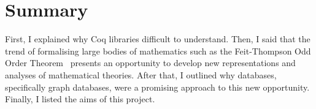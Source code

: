 \newpage

\section{Summary}

First, I explained why Coq libraries difficult to understand. Then, I said
that the trend of formalising large bodies of mathematics such as the
Feit-Thompson Odd Order Theorem~\cite{peterfalvi2000oot, bender1994oot}
presents an opportunity to develop new representations and analyses of
mathematical theories. After that, I outlined why databases, specifically
graph databases, were a promising approach to this new opportunity. Finally, I
listed the aims of this project.
